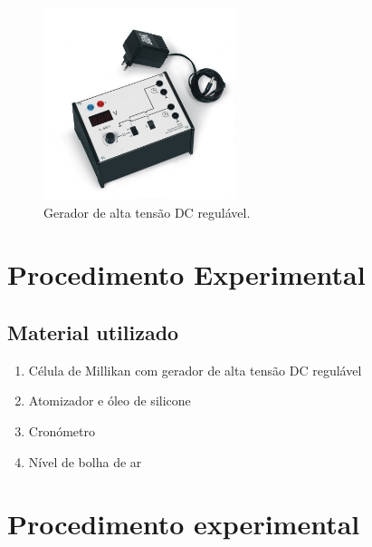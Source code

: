 \documentclass[a4paper,twoside,12pt]{article}      %
\begin{document}
\begin{figure}
	[htb]  \centering 
	\includegraphics[width=0.5\textwidth]{./U13105-230_01_Aparelho-operacional-de-Millikan}
	\caption{Gerador de alta tensão DC regulável. \label{fig:fonteDC_HT}} 
\end{figure}


\newpage
\section{\sf Procedimento Experimental}


\subsection{\sf Material utilizado}

\begin{enumerate}
	\item Célula de Millikan com gerador de alta tensão DC regulável
	\item  Atomizador e óleo de silicone
	\item Cronómetro
	\item Nível de bolha de ar%
\end{enumerate}
\section{\sf Procedimento experimental}
\end{document}
